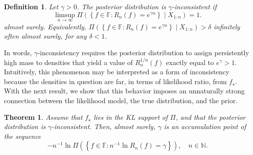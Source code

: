 \documentclass[11pt,twoside]{article}
\newtheorem{theorem}{Theorem}
\newtheorem{definition}{Definition}
\def\NN{\mathbb{N}}
\def\FF{\mathbb{F}}
\def\FF{\mathbb{F}}
\begin{document}
\begin{definition}\label{def:gamma_inconsistency}
    Let $\gamma>0$. The posterior distribution is $\gamma$-\emph{inconsistent} if
    \[
        \limsup_{n\to\infty} \Pi\left(\left\{f \in \FF : R_n(f) = e^{\gamma n} \right\} \mid X_{1:n} \right) = 1.
    \]
    almost surely. Equivalently, $\Pi\left(\left\{f \in \FF : R_n(f) = e^{\gamma n} \right\} \mid X_{1:n} \right) > \delta$ infinitely often almost surely, for any $\delta<1$.
\end{definition}

In words, $\gamma$-inconsistency requires the posterior distribution to assign persistently high mass to densities that yield a value of $R_n^{1/n}(f)$ exactly equal to $e^\gamma>1$. Intuitively, this phenomenon may be interpreted as a form of inconsistency because the densities in question are far, in terms of likelihood ratio, from $f_\star$. With the next result, we show that this behavior imposes an unnaturally strong connection between the likelihood model, the true distribution, and the prior.

\begin{theorem}\label{thm:gamma_inconsistency}
    Assume that $f_\star$ lies in the KL support of $\Pi$, and that the posterior distribution is $\gamma$-inconsistent. Then, almost surely, $\gamma$ is an accumulation point of the sequence
    \[
        -n^{-1} \ln \Pi\left(\left\{f \in \FF : n^{-1}\ln R_n(f) = \gamma \right\}\right), \quad n \in \NN.
    \]
\end{theorem}
\end{document}
